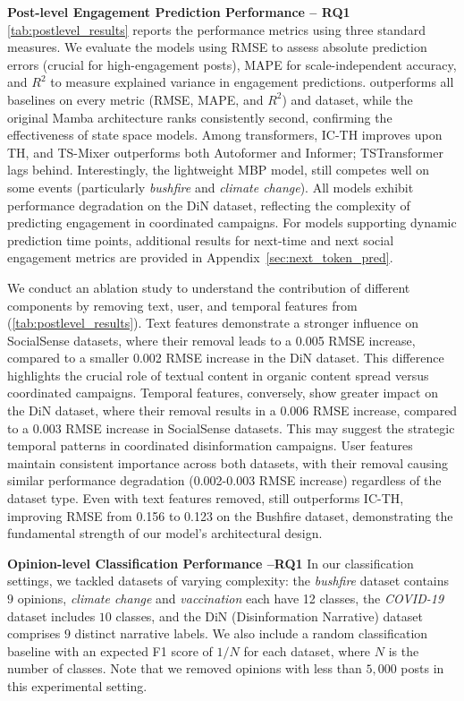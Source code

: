 \noindent\textbf{Post-level Engagement Prediction Performance -- RQ1}
\cref{tab:postlevel_results} reports the performance metrics using three standard measures.
We evaluate the models using RMSE to assess absolute prediction errors (crucial for high-engagement posts), MAPE for scale-independent accuracy, and $R^2$ to measure explained variance in engagement predictions.
\icmamba outperforms all baselines on every metric (RMSE, MAPE, and $R^2$) and dataset, while the original Mamba architecture ranks consistently second, confirming the effectiveness of state space models. Among transformers, IC-TH improves upon TH, and TS-Mixer outperforms both Autoformer and Informer; TSTransformer lags behind. Interestingly, the lightweight MBP model, still competes well on some events (particularly \textit{bushfire} and \textit{climate change}).
All models exhibit performance degradation on the DiN dataset, reflecting the complexity of predicting engagement in coordinated campaigns. For models supporting dynamic prediction time points, additional results for next-time and next social engagement metrics are provided in Appendix~\ref{sec:next_token_pred}.

We conduct an ablation study to understand the contribution of different components by removing text, user, and temporal features from \icmamba (\cref{tab:postlevel_results}). 
Text features demonstrate a stronger influence on SocialSense datasets, where their removal leads to a 0.005 RMSE increase, compared to a smaller 0.002 RMSE increase in the DiN dataset. This difference highlights the crucial role of textual content in organic content spread versus coordinated campaigns. Temporal features, conversely, show greater impact on the DiN dataset, where their removal results in a 0.006 RMSE increase, compared to a 0.003 RMSE increase in SocialSense datasets. This may suggest the strategic temporal patterns in coordinated disinformation campaigns. User features maintain consistent importance across both datasets, with their removal causing similar performance degradation (0.002-0.003 RMSE increase) regardless of the dataset type. Even with text features removed, \icmamba still outperforms IC-TH, improving RMSE from 0.156 to 0.123 on the Bushfire dataset, demonstrating the fundamental strength of our model's architectural design.




\noindent\textbf{Opinion-level Classification Performance --RQ1}
In our classification settings, we tackled datasets of varying complexity: the \textit{bushfire} dataset contains $9$ opinions, \textit{climate change} and \textit{vaccination} each have 12 classes, the \textit{COVID-19} dataset includes $10$ classes, and the DiN (Disinformation Narrative) dataset comprises $9$ distinct narrative labels. 
We also include a random classification baseline with an expected F1 score of $1/N$ for each dataset, where $N$ is the number of classes.
Note that we removed opinions with less than $5,000$ posts in this experimental setting.

